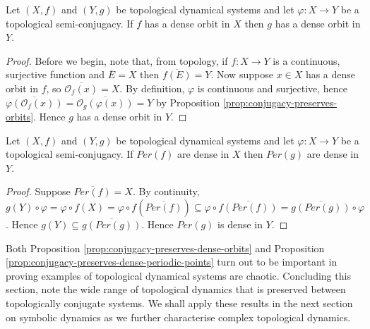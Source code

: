 \begin{prop} \label{prop:conjugacy-preserves-dense-orbits}
    Let $(X, f)$ and $(Y, g)$ be topological dynamical systems and let $\varphi: X \to Y$ be a topological semi-conjugacy. If $f$ has a dense orbit in $X$ then $g$ has a dense orbit in $Y$.
    \begin{proof}
        Before we begin, note that, from topology, if $f: X \to Y$ is a continuous, surjective function and $\overline{E} = X$ then $\overline{f(E)} = Y$. Now suppose $x \in X$ has a dense orbit in $f$, so $\overline{\mathcal{O}_f(x)} = X$. By definition, $\varphi$ is continuous and surjective, hence $\overline{\varphi(\mathcal{O}_{f}(x))} = \overline{\mathcal{O}_{g}(\varphi(x))} = Y$ by Proposition \ref{prop:conjugacy-preserves-orbits}. Hence $g$ has a dense orbit in $Y$.
    \end{proof}
\end{prop}

\begin{prop} \label{prop:conjugacy-preserves-dense-periodic-points}
    Let $(X, f)$ and $(Y,g)$ be topological dynamical systems and let $\varphi: X \to Y$ be a topological semi-conjugacy. If $Per(f)$ are dense in $X$ then $Per(g)$ are dense in $Y$.
    \begin{proof}
        Suppose $\overline{Per(f)} = X$. By continuity, $g(Y) \circ \varphi = \varphi \circ f(X) = \varphi \circ f(\overline{Per(f)}) \subseteq \varphi \circ \overline{f(Per(f))} = \overline{g(Per(g))} \circ \varphi$. Hence $g(Y) \subseteq \overline{g(Per(g))}$. Hence $Per(g)$ is dense in $Y$.
    \end{proof}
\end{prop}

Both Proposition \ref{prop:conjugacy-preserves-dense-orbits} and Proposition \ref{prop:conjugacy-preserves-dense-periodic-points} turn out to be important in proving examples of topological dynamical systems are chaotic. Concluding this section, note the wide range of topological dynamics that is preserved between topologically conjugate systems. We shall apply these results in the next section on symbolic dynamics as we further characterise complex topological dynamics.

